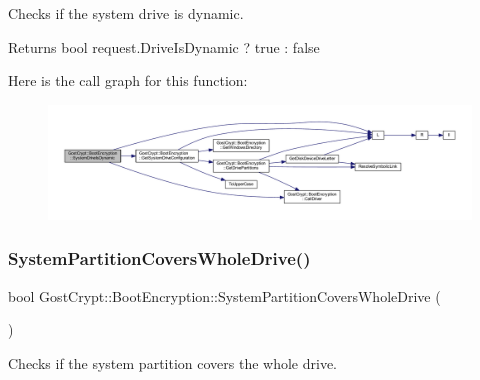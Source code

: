 Checks if the system drive is dynamic. 

\begin{DoxyReturn}{Returns}
bool request.\+Drive\+Is\+Dynamic ? true \+: false 
\end{DoxyReturn}
Here is the call graph for this function\+:
\nopagebreak
\begin{figure}[H]
\begin{center}
\leavevmode
\includegraphics[width=350pt]{class_gost_crypt_1_1_boot_encryption_a639795ac588f2523a75cc573cc537262_cgraph}
\end{center}
\end{figure}
\mbox{\label{class_gost_crypt_1_1_boot_encryption_a770514730f74d63e147ea3b2510f5e0f}} 
\subsubsection{\texorpdfstring{System\+Partition\+Covers\+Whole\+Drive()}{SystemPartitionCoversWholeDrive()}}
{\footnotesize\ttfamily bool Gost\+Crypt\+::\+Boot\+Encryption\+::\+System\+Partition\+Covers\+Whole\+Drive (\begin{DoxyParamCaption}{ }\end{DoxyParamCaption})}



Checks if the system partition covers the whole drive. 

